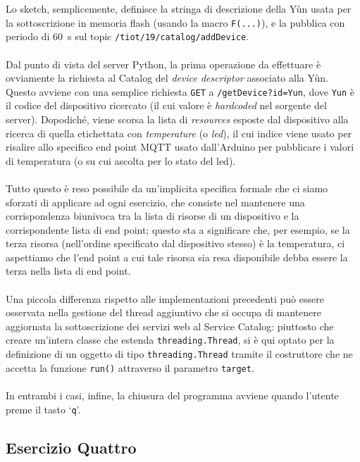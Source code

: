 \documentclass[12pt,a4paper]{article}
\begin{document}
Lo sketch, semplicemente, definisce la stringa di descrizione della Yùn usata per la sottoscrizione in memoria flash (usando la macro \verb|F(...)|), e la pubblica con periodo di \SI{60}{\second} sul topic \verb|/tiot/19/catalog/addDevice|.
\\ \\
Dal punto di vista del server Python, la prima operazione da effettuare è ovviamente la richiesta al Catalog del \textit{device descriptor} associato alla Yùn. Questo avviene con una semplice richiesta \verb|GET| a \verb|/getDevice?id=Yun|, dove \verb|Yun| è il codice del dispositivo ricercato (il cui valore è \textit{hardcoded} nel sorgente del server). Dopodiché, viene scorsa la lista di \textit{resources} esposte dal dispositivo alla ricerca di quella etichettata con \textit{temperature} (o \textit{led}), il cui indice viene usato per risalire allo specifico end point MQTT usato dall'Arduino per pubblicare i valori di temperatura (o su cui ascolta per lo stato del led).
\\ \\
Tutto questo è reso possibile da un'implicita specifica formale che ci siamo sforzati di applicare ad ogni esercizio, che consiste nel mantenere una corrispondenza biunivoca tra la lista di risorse di un dispositivo e la corrispondente lista di end point; questo sta a significare che, per esempio, se la terza risorsa (nell'ordine specificato dal dispositivo stesso) è la temperatura, ci aspettiamo che l'end point a cui tale risorsa sia resa disponibile debba essere la terza nella lista di end point.
\\ \\
Una piccola differenza rispetto alle implementazioni precedenti può essere osservata nella gestione del thread aggiuntivo che si occupa di mantenere aggiornata la sottoscrizione dei servizi web al Service Catalog: piuttosto che creare un'intera classe che estenda \verb|threading.Thread|, si è qui optato per la definizione di un oggetto di tipo \verb|threading.Thread| tramite il costruttore che ne accetta la funzione \verb|run()| attraverso il parametro \verb|target|.
\\ \\
In entrambi i casi, infine, la chiusura del programma avviene quando l'utente preme il tasto `\verb|q|'.

\subsection{Esercizio Quattro}
\end{document}
